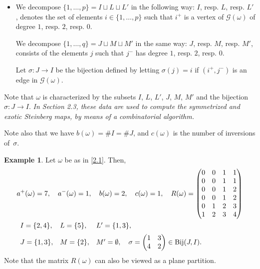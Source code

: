 \documentclass[11pt]{article}
\theoremstyle{definition}
\newtheorem{exam}[theo]{Example}
\numberwithin{equation}{section}
\newcommand{\card}[1]{\# #1}
\begin{document}
\begin{itemize}
\item We decompose $\{1,\ldots,p\}=I\sqcup L\sqcup L'$ in the following way:
$I$, resp. $L$, resp. $L'$, denotes the set of elements $i\in\{1,\ldots,p\}$ such that $i^+$ is a vertex of $\mathcal{G}(\omega)$ of degree $1$, resp. $2$, resp. $0$.

We decompose $\{1,\ldots,q\}=J\sqcup M\sqcup M'$ in the same way: $J$, resp. $M$, resp. $M'$, consists of the elements $j$ such that $j^-$ has degree $1$, resp. $2$, resp. $0$.

Let $\sigma:J\to I$ be the bijection defined by letting $\sigma(j)=i$ if $(i^+,j^-)$ is an edge in $\mathcal{G}(\omega)$.
\end{itemize}
Note that $\omega$ is characterized by the subsets $I$, $L$, $L'$, $J$, $M$, $M'$ and the bijection $\sigma:J\to I$.
{\em In Section 2.3,
these data are used to compute
the symmetrized and exotic Steinberg maps, by means of a combinatorial algorithm.}

Note also that we have $b(\omega)=\card{I}=\card{J}$, and $c(\omega)$ is the number of inversions of~$\sigma$.



\begin{exam}
\label{E2.1}
Let $\omega$ be as in \eqref{2.1}. Then,
\begin{eqnarray*}
 & a^+(\omega)=7,\quad a^-(\omega)=1,\quad b(\omega)=2,\quad c(\omega)=1, \quad
R(\omega)=\mbox{\tiny $\begin{pmatrix} 0 & 0 & 1 & 1\\ 0 & 0 & 1 & 1\\ 0 & 0 & 1 & 2\\ 0 & 0 & 1 & 2\\ 0 & 1 & 2 & 3\\ 1 & 2 & 3 & 4 \end{pmatrix}$}\\
&
\begin{array}{llll}
I=\{2,4\}, & L=\{5\}, & L'=\{1,3\},\\[2mm]
J=\{1,3\}, & M=\{2\}, & M'=\emptyset,
\quad\sigma=\begin{pmatrix} 1 & 3\\ 4 & 2 \end{pmatrix}\in\mathrm{Bij}(J,I).
\end{array}
\end{eqnarray*}
Note that the matrix $R(\omega)$ can also be viewed as a plane partition.
\end{exam}
\end{document}
